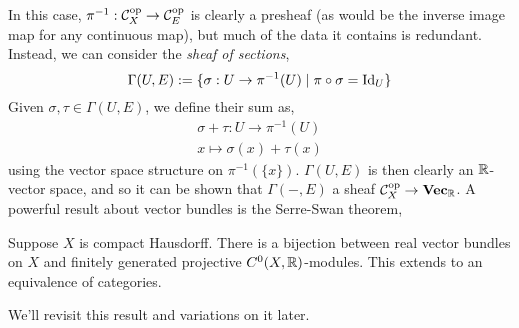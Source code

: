 \documentclass[000-main.tex]{subfiles}
\begin{document}
In this case, $\pi^{-1}: \mathcal{C}_X^{\text{op}}\to \mathcal{C}_E^{\text{op}}$ is clearly a presheaf (as would be the inverse image map for any continuous map), but much of the data it contains is redundant.
Instead, we can consider the \emph{sheaf of sections},
\begin{displaymath}
  \Gamma(U, E) := \{\sigma: U\to \pi^{-1}(U) \mid \pi\circ\sigma = \operatorname{Id}_U\}
\end{displaymath}
Given $\sigma, \tau\in\Gamma(U,E)$, we define their sum as,
\begin{displaymath}
  \begin{gathered}
    \sigma + \tau: U\to \pi^{-1}(U)\\
    x \mapsto \sigma(x) + \tau(x)
  \end{gathered}
\end{displaymath}
using the vector space structure on $\pi^{-1}(\{x\})$.
$\Gamma(U, E)$ is then clearly an $\mathbb{R}$-vector space, and so it can be shown that $\Gamma(-, E)$ a sheaf $\mathcal{C}_X^{\text{op}}\to \mathbf{Vec}_{\mathbb{R}}$.
A powerful result about vector bundles is the Serre-Swan theorem,
\begin{theorem}
  Suppose $X$ is compact Hausdorff.
  There is a bijection between real vector bundles on $X$ and finitely generated projective $C^0(X, \mathbb{R})$-modules.
  This extends to an equivalence of categories.
\end{theorem}
We'll revisit this result and variations on it later.
\end{document}
